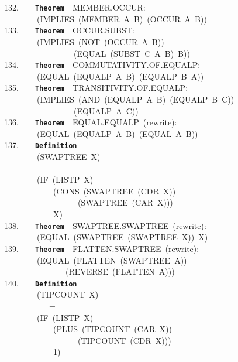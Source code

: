 \documentclass[11pt]{book}
\newenvironment{pubasis}{\begin{flushleft}\ttfamily\small}{\normalsize\rmfamily\end{flushleft}}
\newcommand{\axiomordefinition}[1]{\vspace{6pt}\texttt{\textbf{#1}}}
\begin{document}
\begin{pubasis}
132.~~~~\axiomordefinition{Theorem}~~MEMBER.OCCUR:\\
~~~~~~~~(IMPLIES~(MEMBER~A~B)~(OCCUR~A~B))\\

133.~~~~\axiomordefinition{Theorem}~~OCCUR.SUBST:\\
~~~~~~~~(IMPLIES~(NOT~(OCCUR~A~B))\\
~~~~~~~~~~~~~~~~~(EQUAL~(SUBST~C~A~B)~B))\\

134.~~~~\axiomordefinition{Theorem}~~COM\-MU\-TA\-TIV\-ITY.OF.EQUALP:\\
~~~~~~~~(EQUAL~(EQUALP~A~B)~(EQUALP~B~A))\\

135.~~~~\axiomordefinition{Theorem}~~TRANSITIVITY.OF.EQUALP:\\
~~~~~~~~(IMPLIES~(AND~(EQUALP~A~B)~(EQUALP~B~C))\\
~~~~~~~~~~~~~~~~~(EQUALP~A~C))\\

136.~~~~\axiomordefinition{Theorem}~~EQUAL.EQUALP~(rewrite):\\
~~~~~~~~(EQUAL~(EQUALP~A~B)~(EQUAL~A~B))\\

137.~~~~\axiomordefinition{Definition}\\
~~~~~~~~(SWAPTREE~X)\\
~~~~~~~~~~~=\\
~~~~~~~~(IF~(LISTP~X)\\
~~~~~~~~~~~~(CONS~(SWAPTREE~(CDR~X))\\
~~~~~~~~~~~~~~~~~~(SWAPTREE~(CAR~X)))\\
~~~~~~~~~~~~X)\\

138.~~~~\axiomordefinition{Theorem}~~SWAPTREE.SWAPTREE~(rewrite):\\
~~~~~~~~(EQUAL~(SWAPTREE~(SWAPTREE~X))~X)\\

139.~~~~\axiomordefinition{Theorem}~~FLAT\-TEN.SWAPTREE~(rewrite):\\
~~~~~~~~(EQUAL~(FLATTEN~(SWAPTREE~A))\\
~~~~~~~~~~~~~~~(REVERSE~(FLATTEN~A)))\\

140.~~~~\axiomordefinition{Definition}\\
~~~~~~~~(TIPCOUNT~X)\\
~~~~~~~~~~~=\\
~~~~~~~~(IF~(LISTP~X)\\
~~~~~~~~~~~~(PLUS~(TIPCOUNT~(CAR~X))\\
~~~~~~~~~~~~~~~~~~(TIPCOUNT~(CDR~X)))\\
~~~~~~~~~~~~1)\\


\end{pubasis}
\end{document}
